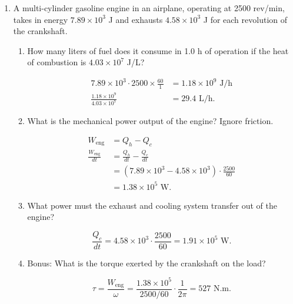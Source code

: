 \documentclass{zc-ust-hw}
\begin{document}
\begin{enumerate}
\item A multi-cylinder gasoline engine in an airplane, operating at 2500
  rev/min, takes in energy $7.89 \times  10^3$ J and exhausts $4.58 \times 10^3$ J for each
  revolution of the crankshaft.  

  \begin{enumerate}
    \item How many liters of fuel does it consume in 1.0 h of operation if the
      heat of combustion is $4.03\times 10^7$ J/L?  
      \begin{sol}
        \begin{align}
          7.89\times 10^3 \cdot 2500 \times \frac{60}{1} &= 1.18 \times 10^9 \text{ J/h} \\
          \frac{1.18\times 10^{9} }{4.03\times 10^{7} } &= 29.4 \text{ L/h}
        .\end{align}
      \end{sol}
    \item What is the mechanical power output of the engine? Ignore friction.
      \begin{sol}
        \begin{align}
          W_\text{eng} &= Q_h - Q_c \\
          \frac{W_\text{eng}}{dt} &= \frac{Q_h}{dt} - \frac{Q_c}{dt} \\
          &= \left( 7.89\times 10^3 -4.58\times 10^3  \right) \cdot \frac{2500}{60} \\
          &= 1.38 \times 10^{5} \text{ W} 
        .\end{align}
      \end{sol}
    \item What power must the exhaust and cooling system transfer out of the engine?
      \begin{sol}
        \begin{equation}
          \frac{Q_c}{dt} = 4.58\times 10^3 \cdot \frac{2500}{60} = 1.91\times 10^{5} \text{ W} 
        .\end{equation}
      \end{sol}
    \item Bonus: What is the torque exerted by the crankshaft on the load?
      \begin{sol}
        \begin{equation}
          \tau = \frac{W_\text{eng} }{\omega }= \frac{1.38\times 10^{5} }{2500 /60}\cdot \frac{1}{2\pi } = 527 \text{ N.m}
        .\end{equation}
      \end{sol}
  \end{enumerate}


\end{enumerate}
\end{document}
